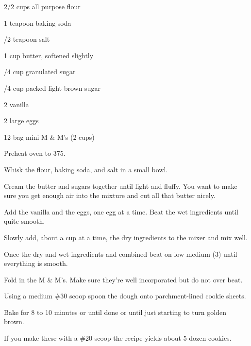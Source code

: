 
\begin{IngredientsAndSteps}
    \ListIngredientsAndSteps
    {
        2/2 cups all purpose flour

        1 teapoon baking soda

        /2 teapoon salt

        \IngredientsSeparatorClear

        1 cup butter, softened slightly

        /4 cup granulated sugar

        /4 cup packed light brown sugar

        \IngredientsSeparatorClear

        2 \tsp[s] vanilla

        2 large eggs

        12 \Ounce bag mini M \& M's (2 cups)
    }
    {
        Preheat oven to 375\Degrees[F].

        Whisk the flour, baking soda, and salt in a small bowl.

        Cream the butter and sugars together until light and fluffy. You want to make sure you get
        enough air into the mixture and cut all that butter nicely.

        Add the vanilla and the eggs, one egg at a time. Beat the wet ingredients until quite smooth.

        Slowly add, about a cup at a time, the dry ingredients to the mixer and mix well.

        Once the dry and wet ingredients and combined beat on low-medium (3) until
        everything is smooth.

        Fold in the M \& M's. Make sure they're well incorporated but do not over beat.

        Using a medium \#30 scoop spoon the dough onto parchment-lined cookie sheets.

        Bake for 8 to 10 minutes or until done or until just starting to turn golden brown.
    }
\end{IngredientsAndSteps}


\begin{ChefNotes}
    {If you make these with a \#20 scoop the recipe yields about 5 dozen cookies.}
\end{ChefNotes}

